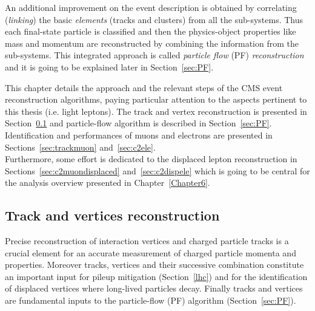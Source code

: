 An additional improvement on the event description is obtained by
correlating (\emph{linking}) the basic \emph{elements} (\ie tracks and
clusters) from all the sub-systems. Thus each final-state
particle is classified and then the physics-object properties like
mass and momentum are reconstructed by combining the information from
the sub-systems. This
integrated approach is called \emph{particle flow} (PF)
\emph{reconstruction}~\cite{CMS:particleflow} and it is going to be
explained later in Section~\ref{sec:PF}.

\vspace{0.7cm}


This chapter details the approach and the relevant steps of the CMS
event reconstruction algorithms, paying particular attention to the
aspects pertinent to this thesis (i.e. light leptons). The track and vertex reconstruction 
is presented in Section~\ref{sec:trackvertex} and particle-flow
algorithm is described in Section~\ref{sec:PF}. Identification and
performances of muons and electrons are presented in
Sections~\ref{sec:trackmuon} and~\ref{sec:c2ele}.\\
Furthermore, some
effort is dedicated to the displaced lepton reconstruction in
Sections~\ref{sec:c2muondisplaced} and~\ref{sec:c2dispele} which is going to be central for the
analysis overview presented in Chapter~\ref{Chapter6}.


\subsection{Track and vertices reconstruction}\label{sec:trackvertex}

Precise reconstruction of interaction vertices and charged
particle tracks is a crucial element for an accurate measurement of
charged particle momenta and properties. Moreover tracks, vertices and their
successive combination constitute an important input for pileup
mitigation (Section~\ref{lhc}) and for the
identification of displaced vertices where long-lived particles decay.
Finally tracks and vertices are fundamental inputs to the
particle-flow (PF) algorithm (Section~\ref{sec:PF}). \\

